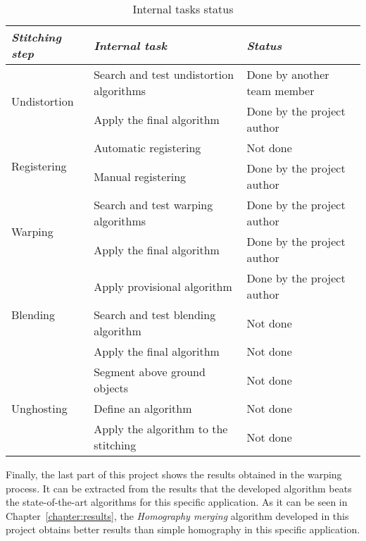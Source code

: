 \begin{table}[H]
\begin{tabular}{l l l}

\emph{Stitching step} & \emph{Internal task} & \emph{Status} \\
\hline\hline
\multirow{2}{*}{Undistortion} &Search and test undistortion algorithms& Done by another team member\\
&Apply the final algorithm & Done by the project author \\
\hline
\multirow{2}{*}{Registering} &Automatic registering& Not done\\
&Manual registering&Done by the project author\\
\hline
\multirow{2}{*}{Warping} &Search and test warping algorithms&  Done by the project author \\
&Apply the final algorithm & Done by the project author \\
\hline
\multirow{3}{*}{Blending} &Apply provisional algorithm &Done by the project author \\
&Search and test blending algorithm& Not done\\
&Apply the final algorithm &Not done \\
\hline
\multirow{3}{*}{Unghosting} &Segment above ground objects &Not done \\
&Define an algorithm& Not done\\
&Apply the algorithm to the stitching &Not done \\
\hline
\end{tabular}
\caption{Internal tasks status}
\label{table:mywork}
\end{table}

Finally, the last part of this project shows the results obtained in the warping process. It can be extracted from the results that the developed algorithm beats the state-of-the-art algorithms for this specific application. As it can be seen in Chapter~\ref{chapter:results}, the \emph{Homography merging} algorithm developed in this project obtains better results than simple homography in this specific application.

